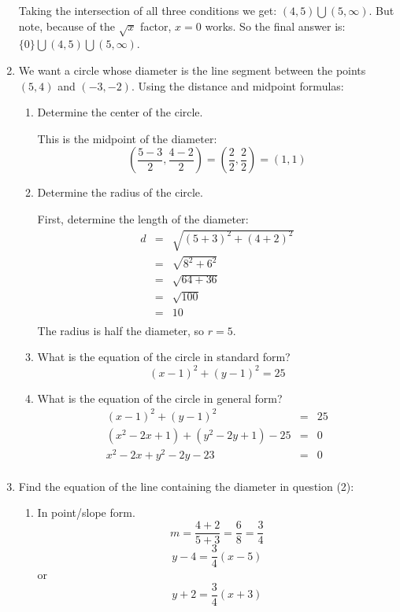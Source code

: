 \documentclass[letterpaper,12pt,fleqn]{article}
\begin{document}
\begin{enumerate}
Taking the intersection of all three conditions we get:
$(4,5)\bigcup(5,\infty)$. But note, because of the $\sqrt{x}$ factor, $x=0$
works. So the final answer is: $\{0\}\bigcup(4,5)\bigcup(5,\infty)$.

\bigskip

\item We want a circle whose diameter is the line segment between the points
$(5,4)$ and $(-3,-2)$. Using the distance and midpoint formulas:
\begin{enumerate}
\item{Determine the center of the circle.}

This is the midpoint of the diameter:
\[\left(\frac{5-3}{2},\frac{4-2}{2}\right)=
    \left(\frac{2}{2},\frac{2}{2}\right)=(1,1)\]

\item{Determine the radius of the circle.}

First, determine the length of the diameter:
\begin{eqnarray*}
d &=& \sqrt{(5+3)^2+(4+2)^2} \\
    &=& \sqrt{8^2+6^2} \\
    &=& \sqrt{64+36} \\
    &=& \sqrt{100} \\
    &=& 10 \\
\end{eqnarray*}
The radius is half the diameter, so $r=5$.

\bigskip

\item{What is the equation of the circle in standard form?}
\[(x-1)^2+(y-1)^2=25\]

\item{What is the equation of the circle in general form?}
\begin{eqnarray*}
(x-1)^2+(y-1)^2 &=& 25 \\
(x^2-2x+1)+(y^2-2y+1)-25 &=& 0 \\
x^2-2x+y^2-2y-23 &=& 0 \\
\end{eqnarray*}
\end{enumerate}

\item Find the equation of the line containing the diameter in question (2):
\begin{enumerate}
\item{In point/slope form.}
\[m=\frac{4+2}{5+3}=\frac{6}{8}=\frac{3}{4}\]
\[y-4=\frac{3}{4}(x-5)\]
or
\[y+2=\frac{3}{4}(x+3)\]


\end{enumerate}
\end{enumerate}
\end{document}

